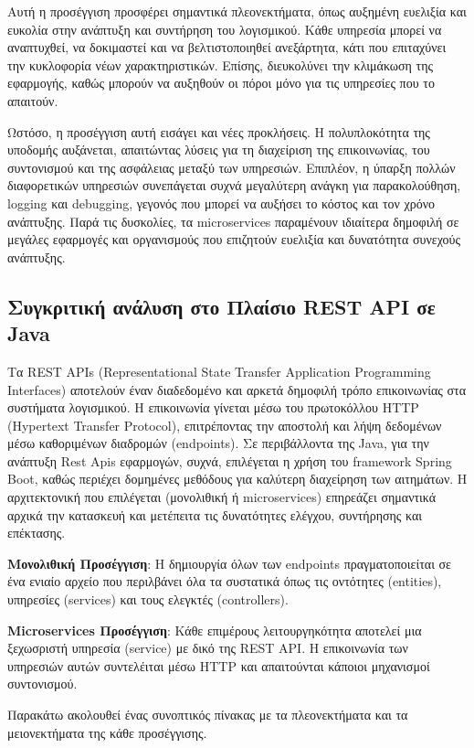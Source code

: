 Αυτή η προσέγγιση προσφέρει σημαντικά πλεονεκτήματα, όπως αυξημένη ευελιξία και ευκολία στην ανάπτυξη και συντήρηση του λογισμικού. Κάθε υπηρεσία μπορεί να αναπτυχθεί, να δοκιμαστεί και να βελτιστοποιηθεί ανεξάρτητα, κάτι που επιταχύνει την κυκλοφορία νέων χαρακτηριστικών. Επίσης, διευκολύνει την κλιμάκωση της εφαρμογής, καθώς μπορούν να αυξηθούν οι πόροι μόνο για τις υπηρεσίες που το απαιτούν. 

Ωστόσο, η προσέγγιση αυτή εισάγει και νέες προκλήσεις. Η πολυπλοκότητα της υποδομής αυξάνεται, απαιτώντας λύσεις για τη διαχείριση της επικοινωνίας, του συντονισμού και της ασφάλειας μεταξύ των υπηρεσιών. Επιπλέον, η ύπαρξη πολλών διαφορετικών υπηρεσιών συνεπάγεται συχνά μεγαλύτερη ανάγκη για παρακολούθηση, logging και debugging, γεγονός που μπορεί να αυξήσει το κόστος και τον χρόνο ανάπτυξης. Παρά τις δυσκολίες, τα microservices παραμένουν ιδιαίτερα δημοφιλή σε μεγάλες εφαρμογές και οργανισμούς που επιζητούν ευελιξία και δυνατότητα συνεχούς ανάπτυξης.

\subsection{Συγκριτική ανάλυση στο Πλαίσιο REST API σε Java}
Τα REST APIs (Representational State Transfer Application Programming Interfaces) αποτελούν έναν διαδεδομένο και αρκετά δημοφιλή τρόπο επικοινωνίας στα συστήματα λογισμικού. Η επικοινωνία γίνεται μέσω του πρωτοκόλλου HTTP (Hypertext Transfer Protocol), επιτρέποντας την αποστολή και λήψη δεδομένων μέσω καθοριμένων διαδρομών (endpoints). Σε περιβάλλοντα της Java, για την ανάπτυξη Rest Apis εφαρμογών, συχνά, επιλέγεται η χρήση του framework Spring Boot, καθώς περιέχει δομημένες μεθόδους για καλύτερη διαχείρηση των αιτημάτων. Η αρχιτεκτονική που επιλέγεται (μονολιθική ή microservices) επηρεάζει σημαντικά αρχικά την κατασκευή και μετέπειτα τις δυνατότητες ελέγχου, συντήρησης και επέκτασης.

\textbf{Μονολιθική Προσέγγιση}: Η δημιουργία όλων των endpoints πραγματοποιείται σε ένα ενιαίο αρχείο που περιλβάνει όλα τα συστατικά όπως τις οντότητες (entities), υπηρεσίες (services) και τους ελεγκτές (controllers). 

\textbf{Microservices Προσέγγιση}: Κάθε επιμέρους λειτουργηκότητα αποτελεί μια ξεχωσριστή υπηρεσία (service) με δικό της REST API. Η επικοινωνία των υπηρεσιών αυτών συντελέιται μέσω HTTP  και απαιτούνται κάποιοι μηχανισμοί συντονισμού.

Παρακάτω ακολουθεί ένας συνοπτικός πίνακας με τα πλεονεκτήματα και τα μειονεκτήματα της κάθε προσέγγισης.

